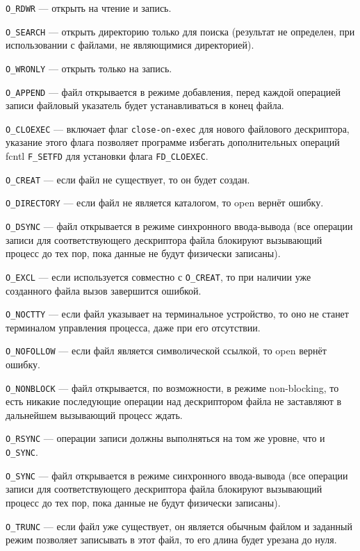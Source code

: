 \texttt{O\_RDWR} --- открыть на чтение и запись.

\texttt{O\_SEARCH} --- открыть директорию только для поиска (результат не определен, при использовании с файлами, не являющимися директорией).

\texttt{O\_WRONLY} --- открыть только на запись.

\texttt{O\_APPEND} --- файл открывается в режиме добавления, перед каждой операцией записи файловый указатель будет устанавливаться в конец файла.

\texttt{O\_CLOEXEC} --- включает флаг \texttt{close-on-exec} для нового файлового дескриптора, указание этого флага позволяет программе избегать дополнительных операций fcntl \texttt{F\_SETFD} для установки флага \texttt{FD\_CLOEXEC}.

\texttt{O\_CREAT} --- если файл не существует, то он будет создан.

\texttt{O\_DIRECTORY} --- если файл не является каталогом, то open вернёт ошибку.

\texttt{O\_DSYNC} --- файл открывается в режиме синхронного ввода-вывода (все операции записи для соответствующего дескриптора файла блокируют вызывающий процесс до тех пор, пока данные не будут физически записаны).

\texttt{O\_EXCL} --- если используется совместно с \texttt{O\_CREAT}, то при наличии уже созданного файла вызов завершится ошибкой.

\texttt{O\_NOCTTY} --- если файл указывает на терминальное устройство, то оно не станет терминалом управления процесса, даже при его отсутствии.

\texttt{O\_NOFOLLOW} --- если файл является символической ссылкой, то open вернёт ошибку.

\texttt{O\_NONBLOCK} --- файл открывается, по возможности, в режиме non-blocking, то есть никакие последующие операции над дескриптором файла не заставляют в дальнейшем вызывающий процесс ждать.

\texttt{O\_RSYNC} --- операции записи должны выполняться на том же уровне, что и \texttt{O\_SYNC}.

\texttt{O\_SYNC} --- файл открывается в режиме синхронного ввода-вывода (все операции записи для соответствующего дескриптора файла блокируют вызывающий процесс до тех пор, пока данные не будут физически записаны).

\texttt{O\_TRUNC} --- если файл уже существует, он является обычным файлом и заданный режим позволяет записывать в этот файл, то его длина будет урезана до нуля.

